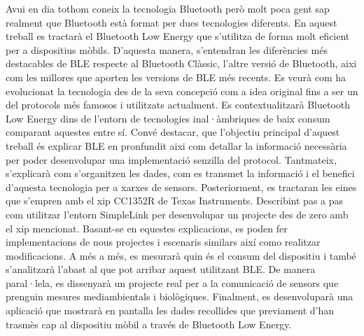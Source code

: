\documentclass[catalan,final]{setup/eetac_tfc_pfc}
\begin{document}

\beforepreface


\begin{resum}{1cm}
Avui en dia tothom coneix la tecnologia Bluetooth però molt poca gent sap realment que Bluetooth està format per dues tecnologies diferents.
En aquest treball es tractarà el Bluetooth Low Energy que s'utilitza de forma molt eficient per a dispositius mòbils.
\newline
\newline
D'aquesta manera, s'entendran les diferències més destacables de BLE respecte al Bluetooth Clàssic, l'altre versió de Bluetooth, aixi com les millores que aporten les versions de BLE més recents.
Es veurà com ha evolucionat la tecnologia des de la seva concepció com a idea original fins a ser un del protocols més famosos i utilitzats actualment.
Es contextualitzarà Bluetooth Low Energy dins de l'entorn de tecnologies inal·àmbriques de baix consum comparant aquestes entre sí.
\newline
\newline
Convé destacar, que l'objectiu principal d'aquest treball és explicar BLE en pronfundit aixi com detallar la informació necessària per poder desenvolupar una implementació senzilla del protocol.
Tantmateix, s'explicarà com s'organitzen les dades, com es transmet la informació i el benefici d'aquesta tecnologia per a xarxes de sensors.
\newline
\newline
Posteriorment, es tractaran les eines que s'empren amb el xip CC1352R de Texas Instruments.
Describint pas a pas com utilitzar l'entorn SimpleLink per desenvolupar un projecte des de zero amb el xip mencionat. Basant-se en equestes explicacions, es poden fer implementacions de nous projectes i escenaris similars així como realitzar modificacions.
\newline
\newline
A més a més, es mesurarà quin és el consum del dispositiu i també s'analitzarà l'abast al que pot arribar aquest utilitzant BLE.
De manera paral·lela, es dissenyarà un projecte real per a la comunicació de sensors que prenguin mesures mediambientals i biològiques.
Finalment, es desenvoluparà una aplicació que mostrarà en pantalla les dades recollides que previament d'han trasmès cap al dispositiu mòbil a través de Bluetooth Low Energy. 
\end{resum}
\end{document}
